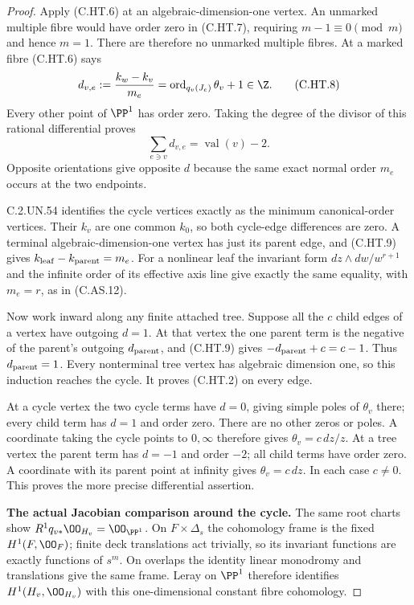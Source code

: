 \begin{proof}
Apply (C.HT.6) at an algebraic-dimension-one vertex. An unmarked
multiple fibre would have order zero in (C.HT.7), requiring
$m-1\equiv0\pmod m$ and hence $m=1$. There are therefore no
unmarked multiple fibres. At a marked fibre (C.HT.6) says
\[
 d_{v,e}:=\frac{k_w-k_v}{m_e}
       =\operatorname{ord}_{q_v(J_e)}\theta_v+1\in\Z.
                                                        \tag{C.HT.8}
\]
Every other point of $\PP^1$ has order zero. Taking the degree of
the divisor of this rational differential proves
\[
                    \sum_{e\ni v}d_{v,e}
                           =\operatorname{val}(v)-2.   \tag{C.HT.9}
\]
Opposite orientations give opposite $d$ because the same exact
normal order $m_e$ occurs at the two endpoints.

C.2.UN.54 identifies the cycle vertices exactly as the minimum
canonical-order vertices. Their $k_v$ are one common $k_0$,
so both cycle-edge differences are zero. A terminal
algebraic-dimension-one vertex has just its parent edge, and
(C.HT.9) gives $k_{\rm leaf}-k_{\rm parent}=m_e$.
For a nonlinear leaf the invariant form
$dz\wedge dw/w^{r+1}$ and the infinite order of its effective
axis line give exactly the same equality, with $m_e=r$,
as in (C.AS.12).

Now work inward along any finite attached tree. Suppose all the
$c$ child edges of a vertex have outgoing $d=1$. At that vertex
the one parent term is the negative of the parent's outgoing
$d_{\rm parent}$, and (C.HT.9) gives
$-d_{\rm parent}+c=c-1$. Thus $d_{\rm parent}=1$.
Every nonterminal tree vertex has algebraic dimension one, so this
induction reaches the cycle. It proves (C.HT.2) on every edge.

At a cycle vertex the two cycle terms have $d=0$, giving simple
poles of $\theta_v$ there; every child term has $d=1$ and order
zero. There are no other zeros or poles. A coordinate taking the
cycle points to $0,\infty$ therefore gives $\theta_v=c\,dz/z$.
At a tree vertex the parent term has $d=-1$ and order $-2$;
all child terms have order zero. A coordinate with its parent
point at infinity gives $\theta_v=c\,dz$. In each case $c\ne0$.
This proves the more precise differential assertion.

\par\medskip\noindent\textbf{The actual Jacobian comparison around the cycle.}
The same root charts show $R^1q_{v*}\OO_{H_v}=\OO_{\PP^1}$.
On $F\times\Delta_s$ the cohomology frame is the fixed
$H^1(F,\OO_F)$; finite deck translations act trivially, so its
invariant functions are exactly functions of $s^m$. On overlaps
the identity linear monodromy and translations give the same
frame. Leray on $\PP^1$ therefore identifies
$H^1(H_v,\OO_{H_v})$ with this one-dimensional constant fibre
cohomology.


\end{proof}
